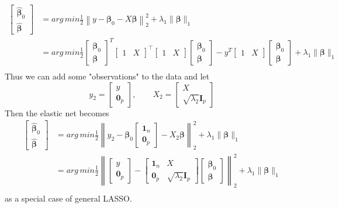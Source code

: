 \documentclass[11pt]{article}
\newcommand{\bbeta}{\bm{\beta}}
\begin{document}
\begin{align*}
\begin{bmatrix}
\hat{\bbeta}_0 \\
\hat{\bbeta}
\end{bmatrix} &= arg\,min\frac{1}{2} \left\|y - \bbeta_0 - X\bbeta\right\|_2^2 + \lambda_1 \|\bbeta\|_1 \\
&= arg\,min\frac{1}{2} 
\begin{bmatrix}
\bbeta_0 \\
\bbeta
\end{bmatrix}^T 
\begin{bmatrix}
1 & X
\end{bmatrix}^\top
\begin{bmatrix}
1 & X
\end{bmatrix} 
\begin{bmatrix} 
\bbeta_0 \\
\bbeta
\end{bmatrix} - y^T
\begin{bmatrix}
1 & X
\end{bmatrix} 
\begin{bmatrix}
\bbeta_0 \\
\bbeta
\end{bmatrix} +  \lambda_1 \|\bbeta\|_1
\\
\end{align*}
Thus we can add some "observations" to the data and let
$$y_2 = \begin{bmatrix}
y \\
\bm0_p
\end{bmatrix},\qquad X_2 =
\begin{bmatrix}
X \\
\sqrt{\lambda_2} \bm{I}_p
\end{bmatrix} $$
Then the elastic net becomes
\begin{align*}
\begin{bmatrix}
\hat{\bbeta}_0 \\
\hat{\bbeta}
\end{bmatrix} &= arg\,min\frac{1}{2} \left\|y_2 - \bbeta_0
\begin{bmatrix}
\bm{1}_n \\
\bm{0}_p
\end{bmatrix} - X_2\bbeta\right\|_2^2 + \lambda_1 \|\bbeta\|_1  \\
 &= arg\,min\frac{1}{2} \left\|
 \begin{bmatrix}
 y \\
 \bm0_p
 \end{bmatrix}
  - 
\begin{bmatrix}
\bm{1}_n & X \\
\bm{0}_p &\sqrt{\lambda_2} \bm{I}_p
\end{bmatrix}  
\begin{bmatrix}
\bbeta_0 \\
\bbeta
\end{bmatrix} 
\right \|_2^2 + \lambda_1 \|\bbeta\|_1  \\
\end{align*}
as a special case of general LASSO.
\end{document}
